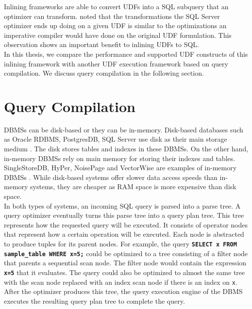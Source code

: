 \documentclass[12pt]{cmuthesis}
\newcommand{\dbSQL}[1]{\texttt{\textbf{#1}}\xspace}
\begin{document}
Inlining frameworks are able to convert UDFs into a SQL subquery that an optimizer can transform. \citeauthor{ramachandra19} noted that the transformations the SQL Server optimizer ends up doing on a given UDF is similar to the optimizations an imperative compiler would have done on the original UDF formulation. This observation shows an important benefit to inlining UDFs to SQL.\\

In this thesis, we compare the performance and supported UDF constructs of this inlining framework with another UDF execution framework based on query compilation. We discuss query compilation in the following section.

\section{Query Compilation}

DBMSs can be disk-based or they can be in-memory. Disk-based databases such as Oracle RDBMS, PostgresDB, SQL Server use disk as their main storage medium \cite{oracle,pgSql, sqlServer}. The disk stores tables and indexes in these DBMSs. On the other hand, in-memory DBMSs rely on main memory for storing their indexes and tables. SingleStoreDB, HyPer, NoisePage and VectorWise are examples of in-memory DBMSs \cite{singlestoredb,hyper, noisepage}. While disk-based systems offer slower data access speeds than in-memory systems, they are cheaper as RAM space is more expensive than disk space.\\

In both types of systems, an incoming SQL query is parsed into a parse tree. A query optimizer eventually turns this parse tree into a query plan tree. This tree represents how the requested query will be executed. It consists of operator nodes that represent how a certain operation will be executed. Each node is abstracted to produce tuples for its parent nodes. For example, the query \dbSQL{SELECT x FROM sample\_table WHERE x=5;} could be optimized to a tree consisting of a filter node that parents a sequential scan node. The filter node would contain the expression \dbSQL{x=5} that it evaluates. The query could also be optimized to almost the same tree with the scan node replaced with an index scan node if there is an index on \texttt{x}. After the optimizer produces this tree, the query execution engine of the DBMS executes the resulting query plan tree to complete the query.\\ 
\end{document}
